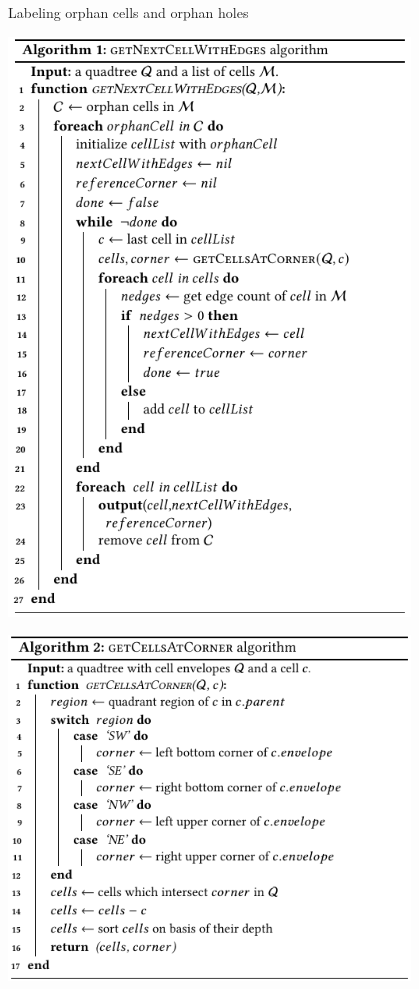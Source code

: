 \documentclass{beamer}
\begin{document}
    \begin{frame}{Labeling orphan cells and orphan holes}
        \begin{minipage}{0.49\textwidth}
            \centering
            \includegraphics[width=0.8\textwidth]{figures/holes3}
        \end{minipage}\hfill %
        \begin{minipage}{0.49\textwidth}
            \centering
            \includegraphics[width=0.8\textwidth]{figures/holes4}
        \end{minipage}
    \end{frame}
    
\end{document}
